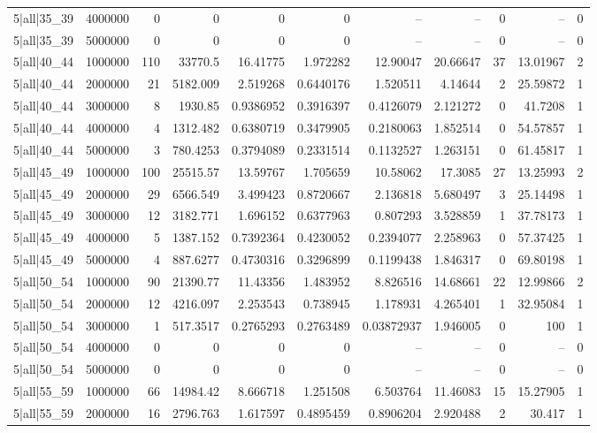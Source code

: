 \begin{tabular}{lrrrrrrrrrr}
5|all|35\_39 & 4000000 & 0 & 0 & 0 & 0 & -- & -- & 0 & -- & 0 \\
5|all|35\_39 & 5000000 & 0 & 0 & 0 & 0 & -- & -- & 0 & -- & 0 \\
5|all|40\_44 & 1000000 & 110 & 33770.5 & 16.41775 & 1.972282 & 12.90047 & 20.66647 & 37 & 13.01967 & 2 \\
5|all|40\_44 & 2000000 & 21 & 5182.009 & 2.519268 & 0.6440176 & 1.520511 & 4.14644 & 2 & 25.59872 & 1 \\
5|all|40\_44 & 3000000 & 8 & 1930.85 & 0.9386952 & 0.3916397 & 0.4126079 & 2.121272 & 0 & 41.7208 & 1 \\
5|all|40\_44 & 4000000 & 4 & 1312.482 & 0.6380719 & 0.3479905 & 0.2180063 & 1.852514 & 0 & 54.57857 & 1 \\
5|all|40\_44 & 5000000 & 3 & 780.4253 & 0.3794089 & 0.2331514 & 0.1132527 & 1.263151 & 0 & 61.45817 & 1 \\
5|all|45\_49 & 1000000 & 100 & 25515.57 & 13.59767 & 1.705659 & 10.58062 & 17.3085 & 27 & 13.25993 & 2 \\
5|all|45\_49 & 2000000 & 29 & 6566.549 & 3.499423 & 0.8720667 & 2.136818 & 5.680497 & 3 & 25.14498 & 1 \\
5|all|45\_49 & 3000000 & 12 & 3182.771 & 1.696152 & 0.6377963 & 0.807293 & 3.528859 & 1 & 37.78173 & 1 \\
5|all|45\_49 & 4000000 & 5 & 1387.152 & 0.7392364 & 0.4230052 & 0.2394077 & 2.258963 & 0 & 57.37425 & 1 \\
5|all|45\_49 & 5000000 & 4 & 887.6277 & 0.4730316 & 0.3296899 & 0.1199438 & 1.846317 & 0 & 69.80198 & 1 \\
5|all|50\_54 & 1000000 & 90 & 21390.77 & 11.43356 & 1.483952 & 8.826516 & 14.68661 & 22 & 12.99866 & 2 \\
5|all|50\_54 & 2000000 & 12 & 4216.097 & 2.253543 & 0.738945 & 1.178931 & 4.265401 & 1 & 32.95084 & 1 \\
5|all|50\_54 & 3000000 & 1 & 517.3517 & 0.2765293 & 0.2763489 & 0.03872937 & 1.946005 & 0 & 100 & 1 \\
5|all|50\_54 & 4000000 & 0 & 0 & 0 & 0 & -- & -- & 0 & -- & 0 \\
5|all|50\_54 & 5000000 & 0 & 0 & 0 & 0 & -- & -- & 0 & -- & 0 \\
5|all|55\_59 & 1000000 & 66 & 14984.42 & 8.666718 & 1.251508 & 6.503764 & 11.46083 & 15 & 15.27905 & 1 \\
5|all|55\_59 & 2000000 & 16 & 2796.763 & 1.617597 & 0.4895459 & 0.8906204 & 2.920488 & 2 & 30.417 & 1 \\

\end{tabular}
